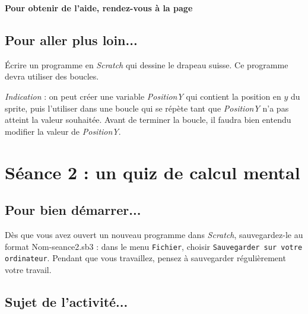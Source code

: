 \vfill



\textbf{Pour obtenir de l'aide, rendez-vous à la page \pageref{aide_seanceScratch1}}




\subsection{Pour aller plus loin...}

Écrire un programme en \emph{Scratch} qui dessine le drapeau suisse. Ce programme devra utiliser des boucles. 


\emph{Indication} : on peut créer une variable \emph{PositionY} qui contient la position en $y$ du sprite, puis l'utiliser dans une boucle qui se répète tant que \emph{PositionY} n'a pas atteint la valeur souhaitée. Avant de terminer la boucle, il faudra bien entendu modifier la valeur de \emph{PositionY}.









%
%
%
%

\section{Séance 2 : un quiz de calcul mental}\label{ficheScratch5e2}

\subsection{Pour bien démarrer...}

Dès que vous avez ouvert un nouveau programme dans \emph{Scratch}, sauvegardez-le au format Nom-seance2.sb3 : dans le menu \texttt{Fichier}, choisir \texttt{Sauvegarder sur votre ordinateur}. Pendant que vous travaillez, pensez à sauvegarder régulièrement votre travail.   


\subsection{Sujet de l'activité...}

